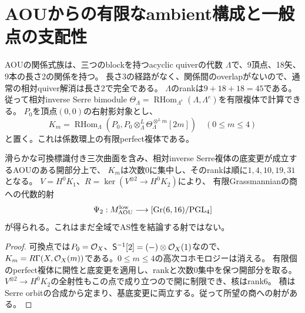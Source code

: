 \section{AOUからの有限なambient構成と一般点の支配性}\label{sec:aou-ambient}
AOUの関係式族は、三つのblockを持つacyclic quiverの代数
$\Lambda$で、9頂点、18矢、9本の長さ2の関係を持つ。
長さ3の経路がなく、関係間のoverlapがないので、通常の相対quiver解消は長さ2で完全である。
$\Lambda$のrankは$9+18+18=45$である。
従って相対inverse Serre bimodule
$\Theta_\Lambda=\operatorname{RHom}_{\Lambda^e}(\Lambda,\Lambda^e)$を有限複体で計算できる。
$P_0$を頂点$(0,0)$の右射影対象とし、
\begin{equation}\label{eq:finite-serre}
 K_m=\operatorname{RHom}_\Lambda
       (P_0,P_0\mathbin{\otimes^L_\Lambda}\Theta_\Lambda^{\otimes^L m}[2m])
       \quad(0\le m\le4)
\end{equation}
と置く。これは係数環上の有限perfect複体である。

\begin{proposition}[低次数からの代数的候補射]\label{prop:aou-candidate}
滑らかな可換標識付き三次曲面を含み、相対inverse Serre複体の底変更が成立するAOUのある開部分上で、
$K_m$は次数0に集中し、そのrankは順に$1,4,10,19,31$となる。
$V=H^0K_1$、$R=\ker(V^{\otimes2}\to H^0K_2)$により、
有限Grassmannianの商への代数的射
\[
 \Psi_2:M_{\rm AOU}^{\rm low}\longrightarrow
 [\operatorname{Gr}(6,16)/\mathrm{PGL}_4]
\]
が得られる。これはまだ全域でAS性を結論する射ではない。
\end{proposition}
\begin{proof}
可換点では$P_0=\mathcal O_X$、$\mathsf S^{-1}[2]=(-)\otimes\mathcal O_X(1)$なので、
$K_m=R\Gamma(X,\mathcal O_X(m))$である。$0\le m\le4$の高次コホモロジーは消える。
有限個のperfect複体に開性と底変更を適用し、rankと次数0集中を保つ開部分を取る。
$V^{\otimes2}\to H^0K_2$の全射性もこの点で成り立つので開に制限でき、核はrank6。
積はSerre orbitの合成から定まり、基底変更に両立する。従って所望の商への射がある。
\end{proof}


